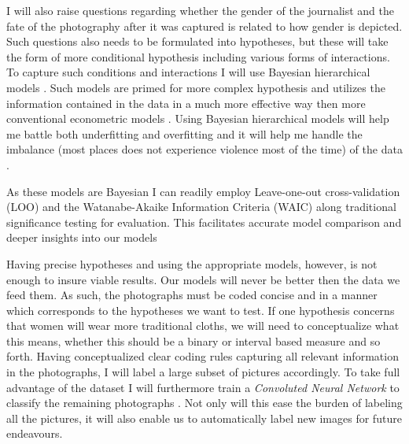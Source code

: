 \documentclass[a4paper]{article}
\begin{document}
I will also raise questions regarding whether the gender of the journalist and the fate of the photography after it was captured is related to how gender is depicted. Such questions also needs to be formulated into hypotheses, but these will take the form of more conditional hypothesis including various forms of interactions. To capture such conditions and interactions I will use Bayesian hierarchical models \citep{Gelman_2006, Gelman_2013, Mcelreath_2018}. Such models are primed for more complex hypothesis and utilizes the information contained in the data in a much more effective way then more conventional econometric models \cite[355]{Mcelreath_2018}. Using Bayesian hierarchical models will help me battle both underfitting and overfitting and it will help me handle the imbalance (most places does not experience violence most of the time) of the data \cite[356-357]{Mcelreath_2018}. \par

As these models are Bayesian I can readily employ Leave-one-out cross-validation (LOO) and the Watanabe-Akaike Information Criteria (WAIC) along traditional significance testing for evaluation. This facilitates accurate model comparison and deeper insights into our models \cite[165-205]{Mcelreath_2018} \par

Having precise hypotheses and using the appropriate models, however, is not enough to insure viable results. Our models will never be better then the data we feed them. As such, the photographs must be coded concise and in a manner which corresponds to the hypotheses we want to test. If one hypothesis concerns that women will wear more traditional cloths, we will need to conceptualize what this means, whether this should be a binary or interval based measure and so forth. Having conceptualized clear coding rules capturing all relevant information in the photographs, I will label a large subset of pictures accordingly. To take full advantage of the dataset I will furthermore train a \emph{Convoluted Neural Network} to classify the remaining photographs \citep[120-122]{francois2017deep}. Not only will this ease the burden of labeling all the pictures, it will also enable us to automatically label new images for future endeavours.\par    
\end{document}
